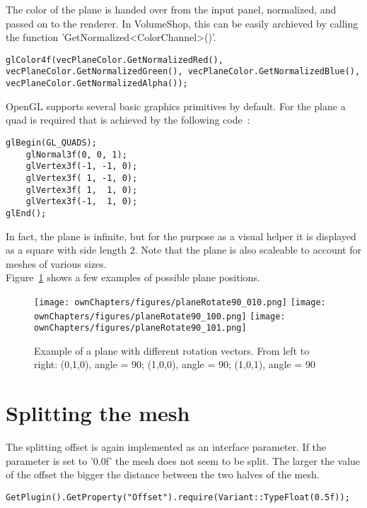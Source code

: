 The color of the plane is handed over from the input panel, normalized, and passed on to the renderer. In VolumeShop, this can be easily archieved by calling the function 'GetNormalized<ColorChannel>()'.
\begin{lstlisting}
glColor4f(vecPlaneColor.GetNormalizedRed(), vecPlaneColor.GetNormalizedGreen(), vecPlaneColor.GetNormalizedBlue(), vecPlaneColor.GetNormalizedAlpha());
\end{lstlisting}

OpenGL supports several basic graphics primitives by default. For the plane a quad is required that is achieved by the following code~\cite{book:computerGraphicsHill}: %
\begin{lstlisting}
glBegin(GL_QUADS);
	glNormal3f(0, 0, 1);
	glVertex3f(-1, -1, 0);
	glVertex3f( 1, -1, 0);
	glVertex3f( 1,  1, 0);
	glVertex3f(-1,  1, 0);
glEnd();
\end{lstlisting}

In fact, the plane is infinite, but for the purpose as a visual helper it is displayed as a square with side length 2. Note that the plane is also scaleable to account for meshes of various sizes.\\

Figure~\ref{fig:plane} shows a few examples of possible plane positions.
\begin{figure}%
\centering
\texttt{[image: ownChapters/figures/planeRotate90\_010.png]}%
\hspace{5.00mm}
\texttt{[image: ownChapters/figures/planeRotate90\_100.png]}%
\hspace{5.00mm}
\texttt{[image: ownChapters/figures/planeRotate90\_101.png]}%
\caption{Example of a plane with different rotation vectors. From left to right: (0,1,0), angle = 90; (1,0,0), angle = 90; (1,0,1), angle = 90}%
\label{fig:plane}%
\end{figure}

\section{Splitting the mesh}

The splitting offset is again implemented as an interface parameter. If the parameter is set to '0.0f' the mesh does not seem to be split. The larger the value of the offset the bigger the distance between the two halves of the mesh.
\begin{lstlisting}
GetPlugin().GetProperty("Offset").require(Variant::TypeFloat(0.5f));
\end{lstlisting}

